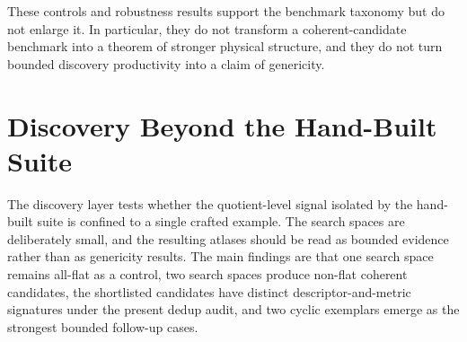 \documentclass[11pt]{article}
\theoremstyle{definition}
\begin{document}
\begin{table}[H]
\centering
\caption{Core-suite bounded robustness summary.}
\label{tab:robustness-core-suite}
\footnotesize
\setlength{\tabcolsep}{4pt}
\end{table}

These controls and robustness results support the benchmark taxonomy but do not enlarge it. In particular, they do not transform a coherent-candidate benchmark into a theorem of stronger physical structure, and they do not turn bounded discovery productivity into a claim of genericity.

\section{Discovery Beyond the Hand-Built Suite}\label{sec:discovery}
The discovery layer tests whether the quotient-level signal isolated by the hand-built suite is confined to a single crafted example. The search spaces are deliberately small, and the resulting atlases should be read as bounded evidence rather than as genericity results. The main findings are that one search space remains all-flat as a control, two search spaces produce non-flat coherent candidates, the shortlisted candidates have distinct descriptor-and-metric signatures under the present dedup audit, and two cyclic exemplars emerge as the strongest bounded follow-up cases.
\end{document}
